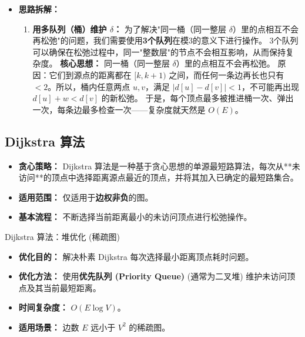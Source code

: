 \documentclass[11pt]{beamer}
\begin{document}
\begin{frame}
    \begin{itemize}
        \item \textbf{思路拆解：}
        \begin{enumerate}[resume]
            \item \textbf{用多队列（桶）维护 $\delta$：}
            为了解决"同一桶（同一整层 $\delta$）里的点相互不会再松弛"的问题，我们需要使用\textbf{3个队列}在模3的意义下进行操作。
            3个队列可以确保在松弛过程中，同一"整数层"的节点不会相互影响，从而保持复杂度。
            \textbf{核心思想：} 同一桶（同一整层 $\delta$）里的点相互不会再松弛。
            原因：它们到源点的距离都在 $[k, k+1)$ 之间，而任何一条边再长也只有 $< 2$。所以，桶内任意两点 $u, v$，满足 $|d[u] - d[v]| < 1$，不可能再出现 $d[u] + w < d[v]$ 的新松弛。
            于是，每个顶点最多被推进桶一次、弹出一次，每条边最多检查一次——复杂度就天然是 $O(E)$。
        \end{enumerate}
    \end{itemize}
\end{frame}

\subsection{Dijkstra 算法}
\begin{frame}
    \begin{itemize}
        \item \textbf{贪心策略：} Dijkstra 算法是一种基于贪心思想的单源最短路算法，每次从**未访问**的顶点中选择距离源点最近的顶点，并将其加入已确定的最短路集合。
        \item \textbf{适用范围：} 仅适用于\textbf{边权非负}的图。
        \item \textbf{基本流程：} 不断选择当前距离最小的未访问顶点进行松弛操作。
    \end{itemize}
\end{frame}

\begin{frame}
    Dijkstra 算法：堆优化 (稀疏图)
    \begin{itemize}
        \item \textbf{优化目的：} 解决朴素 Dijkstra 每次选择最小距离顶点耗时问题。
        \item \textbf{优化方法：} 使用\textbf{优先队列 (Priority Queue)} (通常为二叉堆) 维护未访问顶点及其当前最短距离。
        \item \textbf{时间复杂度：} $O(E \log V)$。
        \item \textbf{适用场景：} 边数 $E$ 远小于 $V^2$ 的稀疏图。
    \end{itemize}
\end{frame}
\end{document}
